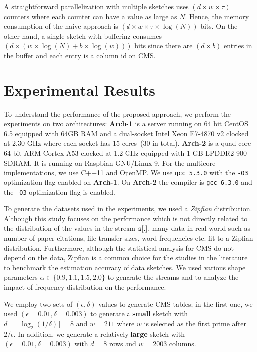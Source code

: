 \documentclass[10pt, conference, compsocconf]{IEEEtran}
\begin{document}
A straightforward parallelization with multiple sketches uses $(d \times w \times \tau)$ counters where each counter can have a value as large as $N$. Hence, the memory consumption of the naive approach is $(d \times w \times \tau \times \log(N))$ bits. On the other hand, a single sketch with buffering consumes $(d \times (w \times \log(N) + b \times \log(w)))$ bits since there are $(d \times b)$ entries in the buffer and each entry is a column id on CMS. 

\section{Experimental Results}\label{sec:exp}

To understand the performance of the proposed approach, we perform the experiments on two architectures:  {\bf Arch-1} is a server running on 64 bit CentOS 6.5 equipped with 64GB RAM and a dual-socket Intel Xeon E7-4870 v2 clocked at 2.30 GHz where each socket has 15 cores~(30 in total). {\bf Arch-2} is a quad-core 64-bit ARM Cortex A53 clocked at 1.2 GHz equipped with 1 GB LPDDR2-900 SDRAM. It is running on Raspbian GNU/Linux 9. For the multicore implementations, we use C++11 and OpenMP. We use {\tt gcc 5.3.0} with the {\tt -O3} optimization flag enabled on {\bf Arch-1}. On {\bf Arch-2} the compiler is {\tt gcc 6.3.0} and the {\tt -O3} optimization flag is enabled.

To generate the datasets used in the experiments, we used a {\em Zipfian} distribution. Although this study focuses on the performance which is not directly related to the distribution of the values in the stream ${\tt s}[.]$, many data in real world such as number of paper citations, file transfer sizes, word frequencies etc. fit to a Zipfian distribution. Furthermore, although the statistical analysis for CMS do not depend on the data, Zipfian is a common choice for the studies in the literature to benchmark the estimation accuracy of data sketches. We used various shape parameters $\alpha \in \{0.9, 1.1, 1.5, 2.0\}$ to generate the streams and to analyze the impact of frequency distribution on the performance. 

We employ two sets of $(\epsilon, \delta)$ values to generate CMS tables; in the first one, we used $(\epsilon = 0.01, \delta = 0.003)$ to generate a {\bf small} sketch with $d = \lceil \log_2(1/\delta) \rceil = 8$ and $w = 211$ where $w$ is selected as the first prime after $2/\epsilon$. In addition, we generate a relatively {\bf large} sketch with $(\epsilon = 0.01, \delta = 0.003)$ with $d = 8$ rows and $w = 2003$ columns. 
\end{document}
